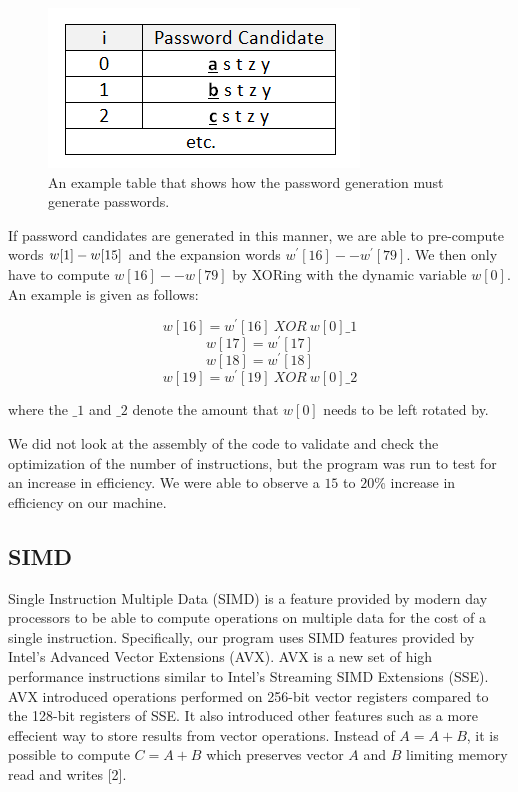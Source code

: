 \documentclass[letterpaper, 10 pt, conference]{ieeeconf}  %
\begin{document}
\begin{figure}[thpb]
	\centering
	\includegraphics[scale=.75]{passwordGeneration}
    \caption{An example table that shows how the password generation must generate passwords.}
\end{figure}

If password candidates are generated in this manner, we are able to pre-compute words $w[1]\--w[15]$ and the expansion words $w^{'}[16]--w^{'}[79]$.  We then only have to compute $w[16]--w[79]$ by XORing with the dynamic variable $w[0]$.  An example is given as follows:


$$w[16] = w^{'}[16]\ XOR\ w[0]\_1$$
$$w[17] = w^{'}[17]$$
$$w[18] = w^{'}[18]$$
$$w[19] = w^{'}[19]\ XOR\ w[0]\_2$$

\noindent
where the $\_1$ and $\_2$ denote the amount that $w[0]$ needs to be left rotated by.

We did not look at the assembly of the code to validate and check the  optimization of the number of instructions, but the program was run to test for an increase in efficiency.  We were able to observe a $15$ to $20\%$ increase in efficiency on our machine.
   
\subsection{SIMD}

Single Instruction Multiple Data (SIMD) is a feature provided by modern day processors to be able to compute operations on multiple data for the cost of a single instruction.  Specifically, our program uses SIMD features provided by Intel's Advanced Vector Extensions (AVX). AVX is a new set of high performance instructions similar to Intel's Streaming SIMD Extensions (SSE).  AVX introduced operations performed on 256-bit vector registers compared to the 128-bit registers of SSE.  It also introduced other features such as a more effecient way to store results from vector operations.  Instead of $A = A + B$, it is possible to compute $C = A + B$ which preserves vector $A$ and $B$ limiting memory read and writes [2].
\end{document}
